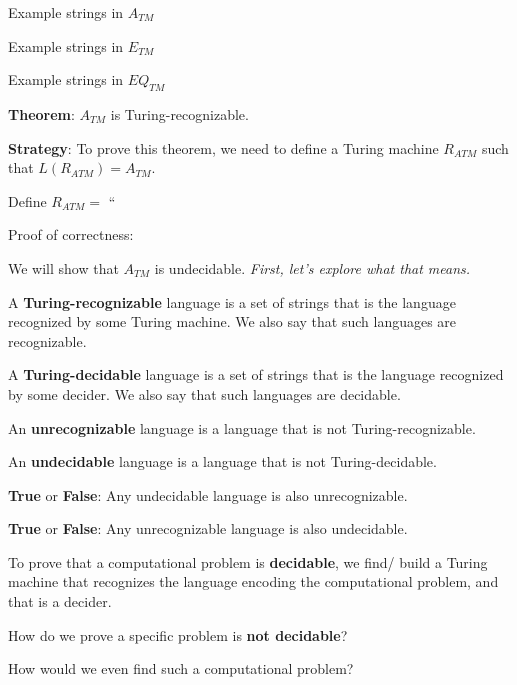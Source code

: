 \documentclass[12pt, oneside]{article}
\begin{document}
Example strings in $A_{TM}$

\vfill

Example strings in  $E_{TM}$

\vfill

Example strings in  $EQ_{TM}$

\vfill

\newpage

{\bf  Theorem}: $A_{TM}$  is  Turing-recognizable.


{\bf  Strategy}:  To prove this theorem, we need  to  define  a Turing  machine  $R_{ATM}$ such that 
$L(R_{ATM}) = A_{TM}$.


Define $R_{ATM} =  $ ``

\vspace{150pt}


Proof of correctness: 


\vfill
\vfill

We will show that $A_{TM}$ is undecidable.   {\it First, let's explore what that means.}

\newpage

A {\bf Turing-recognizable} language is a set of strings that 
is the language recognized by some Turing machine. We also 
say that such languages are recognizable.

A {\bf Turing-decidable} language is a set of strings that 
is the language recognized by some decider. We also 
say that such languages are decidable.

An {\bf unrecognizable} language is a language that is not Turing-recognizable.

An {\bf undecidable} language is a language that is not Turing-decidable.


{\bf  True} or {\bf False}: Any  undecidable language  is  also  unrecognizable.


{\bf  True} or {\bf False}: Any  unrecognizable language  is  also  undecidable.


To prove that a computational problem is {\bf decidable}, we find/ build a Turing 
machine that recognizes the language encoding the computational problem, and that 
is a decider.


How do we prove a specific problem is {\bf not decidable}?

How would we even find such a computational problem?
\end{document}
